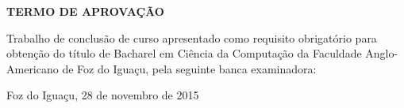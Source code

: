 \begin{folhadeaprovacao} %
\begin{center}
	\vspace*{1cm}  
  	\large\textbf{TERMO DE APROVAÇÃO}
  	
  	\vspace*{1cm} %
  	{\large\textbf\imprimirautor}

   \vspace*{1cm} %
    {\large\textbf\imprimirtitulo}   
 \end{center}     
  
	
	\hspace{.4\textwidth}
	\SingleSpace\noindent\normalsize{Trabalho de conclusão de curso apresentado como requisito obrigatório para obtenção do título de Bacharel em Ciência da Computação da Faculdade Anglo-Americano de Foz do Iguaçu, pela seguinte banca examinadora:}
   
    
  
   \vspace*{0.5cm}  %
   \vspace*{2.5cm}
   \begin{center}
   	{Foz do Iguaçu, 28 de novembro de 2015}
   \end{center}
   
 
\end{folhadeaprovacao}